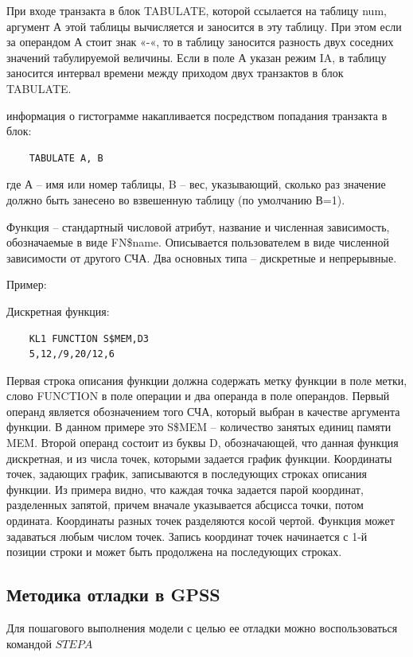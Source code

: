 \documentclass[14pt]{extarticle}
\begin{document}
При входе транзакта в блок TABULATE, которой ссылается на таблицу num, аргумент А этой таблицы вычисляется и заносится в эту таблицу. При этом если за операндом А стоит знак «-«, то в таблицу заносится разность двух соседних значений табулируемой величины. Если в поле А указан режим IA, в таблицу заносится интервал времени между приходом двух транзактов в блок TABULATE.

информация о гистограмме накапливается посредством попадания транзакта в блок:

\begin{lstlisting}
	TABULATE A, B
\end{lstlisting}

где А – имя или номер таблицы, B – вес, указывающий, сколько раз значение должно быть занесено во взвешенную таблицу (по умолчанию В=1).

Функция – стандартный числовой атрибут, название и численная зависимость, обозначаемые в виде FN\$name. Описывается пользователем в виде численной зависимости от другого СЧА. Два основных типа – дискретные и непрерывные.

Пример: 

Дискретная функция:

\begin{lstlisting}
	KL1 FUNCTION S$MEM,D3
	5,12,/9,20/12,6
\end{lstlisting}

Первая строка описания функции должна содержать метку функции в поле метки, слово FUNCTION в поле операции и два операнда в поле операндов. Первый операнд является обозначением того СЧА, который выбран в качестве аргумента функции. В данном примере это S\$MEM – количество занятых единиц памяти MEM. Второй операнд состоит из буквы D, обозначающей, что данная функция дискретная, и из числа точек, которыми задается график функции. Координаты точек, задающих график, записываются в последующих строках описания функции. Из примера видно, что каждая точка задается парой координат, разделенных запятой, причем вначале указывается абсцисса точки, потом ордината. Координаты разных точек разделяются косой чертой. Функция может задаваться любым числом точек. Запись координат точек начинается с 1-й позиции строки и может быть продолжена на последующих строках.

\subsection*{Методика отладки в GPSS}

Для пошагового выполнения модели с целью ее отладки можно воспользоваться командой $STEP A$
\end{document}
